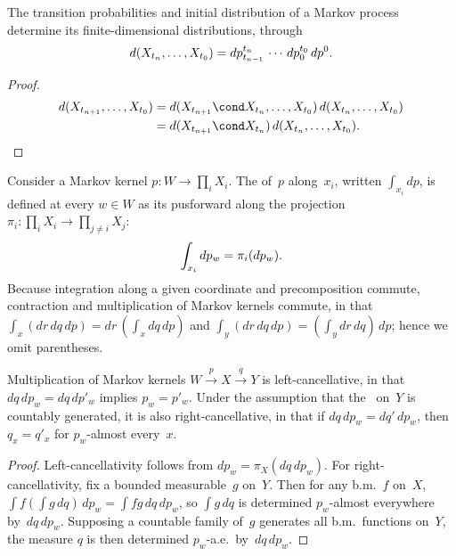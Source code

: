 \begin	{proposition}
The transition probabilities and initial distribution of a Markov process
determine its finite-dimensional distributions, through \[
	d(X_{t_n},\dots,X_{t_0})
	= dp^{t_n}_{t_{n-1}} \,\dotsm\, dp^{t_0}_0 \, dp^0 \text.
\]
\end	{proposition}
\begin	{proof}
\begin	{align*}
	d(X_{t_{n+1}},\dots,X_{t_0})
	&= d(X_{t_{n+1}}\cond X_{t_n},\dots,X_{t_0}) \,
		d(X_{t_n},\dots,X_{t_0}) \\
	&= d(X_{t_{n+1}}\cond X_{t_n}) \,
		d(X_{t_n},\dots,X_{t_0})
	\text. \qedhere
\end	{align*}
\end	{proof}

\begin	{definition}
Consider a Markov kernel
\( p \colon W \to \prod_i X_i \).
The  of~$p$ along~$x_i$,
written \( \int_{x_i} dp \),
is defined at every \( w \in W \) as its pusforward along the projection
\( \pi_i \colon \prod_i X_i \to \prod_{j\ne i} X_j \): \[
	\int_{x_i} dp_w = \pi_i(dp_w) \text.
\]
Because integration along a given coordinate and precomposition commute,
contraction and multiplication of Markov kernels commute,
in that \( \int_x (dr\,dq\,dp) = dr\,(\int_x dq\,dp) \)
and \( \int_y (dr\,dq\,dp) = (\int_y dr\,dq)\,dp \);
hence we omit parentheses.
\end	{definition}

\begin	{proposition}
Multiplication of Markov kernels \( W \stackrel p\to X \stackrel q\to Y \)
is left-cancellative,
in that \( dq\,dp_w = dq\,dp'_w \) implies \( p_w = p'_w \).
Under the assumption that the \salg\ on~$Y$ is countably generated,
it is also right-cancellative,
in that if \( dq\,dp_w = dq'\,dp_w \),
then \( q_x = q'_x \) for $p_w$\nobreakdash-almost every~$x$.
\end	{proposition}
\begin	{proof}
Left-cancellativity follows from \( dp_w = \pi_X(dq\,dp_w) \).
For right-cancellativity, fix a bounded measurable~$g$ on~$Y$.
Then for any b.m.~$f$ on~$X$,
\( \int f (\int g\,dq) \,dp_w = \int fg \,dq\,dp_w \),
so $\int g\,dq$ is determined $p_w$\nobreakdash-almost everywhere
by~$dq\,dp_w$.
Supposing a countable family of~$g$ generates all b.m.~functions on~$Y$,
the measure $q$ is then determined $p_w$\nobreakdash-a.e.\ by~\(dq\,dp_w\).
\end	{proof}

